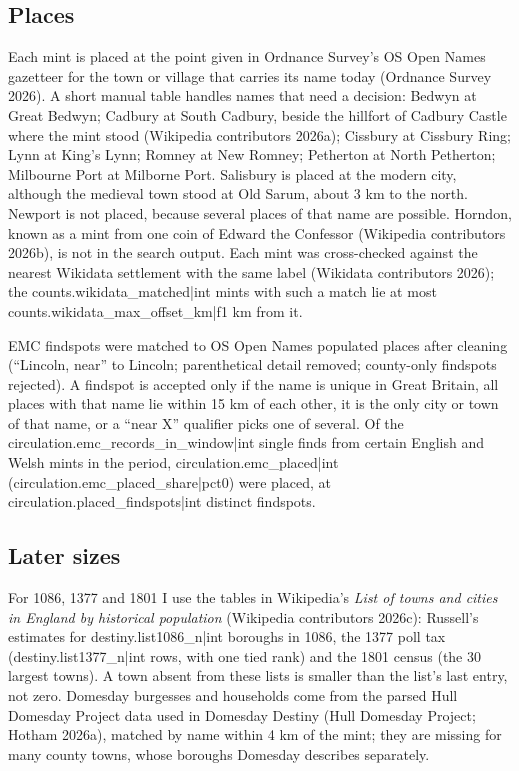 \documentclass[11pt,a4paper]{article}
\begin{document}
\subsection{Places}

Each mint is placed at the point given in Ordnance Survey's OS Open Names gazetteer for the town or village that carries its name today (Ordnance Survey 2026). A short manual table handles names that need a decision: Bedwyn at Great Bedwyn; Cadbury at South Cadbury, beside the hillfort of Cadbury Castle where the mint stood (Wikipedia contributors 2026a); Cissbury at Cissbury Ring; Lynn at King's Lynn; Romney at New Romney; Petherton at North Petherton; Milbourne Port at Milborne Port. Salisbury is placed at the modern city, although the medieval town stood at Old Sarum, about 3 km to the north. Newport is not placed, because several places of that name are possible. Horndon, known as a mint from one coin of Edward the Confessor (Wikipedia contributors 2026b), is not in the search output. Each mint was cross-checked against the nearest Wikidata settlement with the same label (Wikidata contributors 2026); the {{counts.wikidata_matched|int}} mints with such a match lie at most {{counts.wikidata_max_offset_km|f1}} km from it.

EMC findspots were matched to OS Open Names populated places after cleaning (``Lincoln, near'' to Lincoln; parenthetical detail removed; county-only findspots rejected). A findspot is accepted only if the name is unique in Great Britain, all places with that name lie within 15 km of each other, it is the only city or town of that name, or a ``near X'' qualifier picks one of several. Of the {{circulation.emc_records_in_window|int}} single finds from certain English and Welsh mints in the period, {{circulation.emc_placed|int}} ({{circulation.emc_placed_share|pct0}}) were placed, at {{circulation.placed_findspots|int}} distinct findspots.

\subsection{Later sizes}

For 1086, 1377 and 1801 I use the tables in Wikipedia's \textit{List of towns and cities in England by historical population} (Wikipedia contributors 2026c): Russell's estimates for {{destiny.list1086_n|int}} boroughs in 1086, the 1377 poll tax ({{destiny.list1377_n|int}} rows, with one tied rank) and the 1801 census (the 30 largest towns). A town absent from these lists is smaller than the list's last entry, not zero. Domesday burgesses and households come from the parsed Hull Domesday Project data used in Domesday Destiny (Hull Domesday Project; Hotham 2026a), matched by name within 4 km of the mint; they are missing for many county towns, whose boroughs Domesday describes separately.
\end{document}
